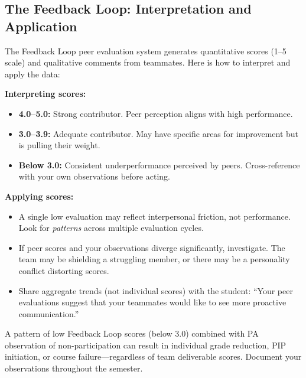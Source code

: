 \subsection{The Feedback Loop: Interpretation and Application}

The Feedback Loop peer evaluation system generates quantitative scores (1--5 scale) and qualitative comments from teammates. Here is how to interpret and apply the data:

\textbf{Interpreting scores:}
\begin{itemize}[nosep,leftmargin=1.5em]
\item \textbf{4.0--5.0:} Strong contributor. Peer perception aligns with high performance.
\item \textbf{3.0--3.9:} Adequate contributor. May have specific areas for improvement but is pulling their weight.
\item \textbf{Below 3.0:} Consistent underperformance perceived by peers. Cross-reference with your own observations before acting.
\end{itemize}

\textbf{Applying scores:}
\begin{itemize}[nosep,leftmargin=1.5em]
\item A single low evaluation may reflect interpersonal friction, not performance. Look for \emph{patterns} across multiple evaluation cycles.
\item If peer scores and your observations diverge significantly, investigate. The team may be shielding a struggling member, or there may be a personality conflict distorting scores.
\item Share aggregate trends (not individual scores) with the student: ``Your peer evaluations suggest that your teammates would like to see more proactive communication.''
\end{itemize}

\begin{warnbox}
A pattern of low Feedback Loop scores (below 3.0) combined with PA observation of non-participation can result in individual grade reduction, PIP initiation, or course failure---regardless of team deliverable scores. Document your observations throughout the semester.
\end{warnbox}


